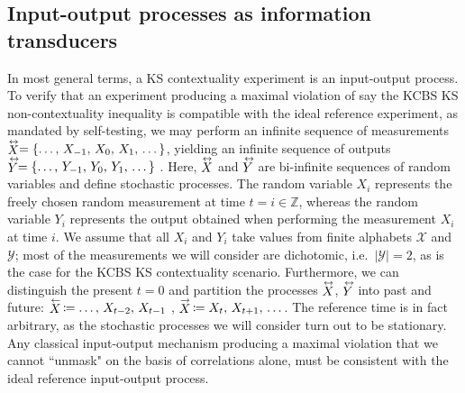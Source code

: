 \subsection{Input-output processes as information transducers}
In most general terms, a KS contextuality experiment is an input-output process. To verify that an experiment producing a maximal violation of say the KCBS KS non-contextuality inequality is compatible with the ideal reference experiment, as mandated by self-testing, we may perform an infinite sequence of measurements  $\oset{\leftrightarrow}{X}=\{\dots,\thinspace X_{-1},\thinspace X_{0},\thinspace X_{1},\thinspace\dots\}$, yielding an infinite sequence of outputs $\oset{\leftrightarrow}{Y}=\{\dots,\thinspace Y_{-1},\thinspace Y_{0},\thinspace Y_{1},\thinspace \dots\}$ \cite{Cabello2018}. Here, $\oset{\leftrightarrow}{X}$ and $\oset{\leftrightarrow}{Y}$ are bi-infinite sequences of random variables and define stochastic processes. The random variable $X_{i}$ represents the freely chosen random measurement at time $t=i\in\mathbb{Z}$, whereas the random variable $Y_{i}$ represents the output obtained when performing the measurement $X_{i}$ at time $i$. We assume that all $X_i$ and $Y_i$ take values from finite alphabets $\mathcal{X}$ and $\mathcal{Y}$; most of the measurements we will consider are dichotomic, i.e.\ $\vert\mathcal{Y}\vert=2$, as is the case for the KCBS KS contextuality scenario. Furthermore, we can distinguish the present $t=0$ and partition the processes $\oset{\leftrightarrow}{X}$, $\oset{\leftrightarrow}{Y}$ into past and future: $\oset{\leftarrow}{X}\thinspace\coloneqq \dots,\thinspace X_{t-2},\thinspace X_{t-1}$ , $\oset{\rightarrow}{X}\thinspace\coloneqq X_t,\thinspace X_{t+1},\thinspace \dots$. The reference time is in fact arbitrary, as the stochastic processes we will consider turn out to be stationary. Any classical input-output mechanism producing a maximal violation that we cannot ``unmask" on the basis of correlations alone, must be consistent with the ideal reference input-output process.

